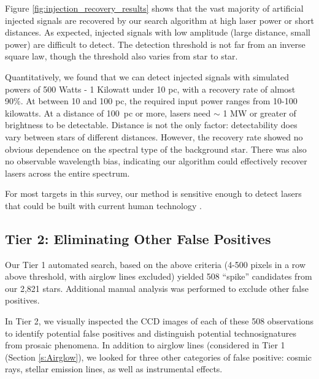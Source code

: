 \documentclass[twocolumn]{aastex701}
\begin{document}
Figure \ref{fig:injection_recovery_results} shows that the vast majority of artificial injected signals are recovered by our search algorithm at high laser power or short distances. As expected, injected signals with low amplitude (large distance, small power) are difficult to detect. The detection threshold is not far from an inverse square law, though the threshold also varies from star to star.  

Quantitatively, we found that we can detect injected signals with simulated powers of 500 Watts - 1 Kilowatt under 10 pc, with a recovery rate of almost 90\%. At between 10 and 100 pc, the required input power ranges from 10-100 kilowatts. At a distance of  100~pc or more, lasers need $\sim$ 1 MW or greater of brightness to be detectable. Distance is not the only factor: detectability does vary between stars of different distances.  However, the recovery rate showed no obvious dependence on the spectral type of the background star. There was also no observable wavelength bias, indicating our algorithm could effectively recover lasers across the entire spectrum.

For most targets in this survey, our method is sensitive enough to detect lasers that could be built with current human technology \citep{Lander1997ContinuouswaveCD}.


\subsection{Tier 2: Eliminating Other False Positives}
\label{s:falsepositive}
Our Tier 1 automated search, based on the above criteria (4-500 pixels in a row above threshold, with airglow lines excluded) yielded 508 \enquote{spike} candidates from our 2,821 stars. Additional manual analysis was performed to exclude other false positives.

In Tier 2, we visually inspected the CCD images of each of these 508 observations to identify potential false positives and distinguish potential technosignatures from prosaic phenomena.  In addition to airglow lines (considered in Tier 1 (Section \ref{s:Airglow}), we looked for three other categories of false positive: cosmic rays, stellar emission lines, as well as instrumental effects.
\end{document}
